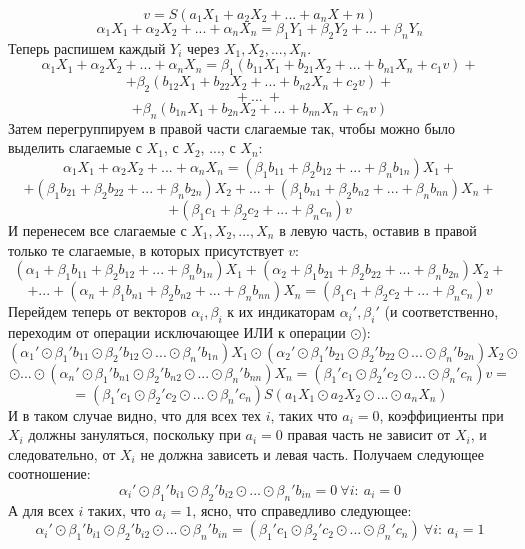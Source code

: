 \documentclass[a4paper,12pt]{report}
\theoremstyle{plain} %
\theoremstyle{definition}
\theoremstyle{remark}
\begin{document}
\begin{large}
$$v = S(a_1X_1 + a_2X_2 + ... + a_nX+n)$$
$$\alpha_1X_1 + \alpha_2X_2 + ... + \alpha_nX_n = \beta_1Y_1 + \beta_2Y_2 + ... + \beta_nY_n $$
Теперь распишем каждый $Y_i$ через $X_1, X_2, ..., X_n$.
$$\alpha_1X_1 + \alpha_2X_2 + ... + \alpha_nX_n = \beta_1(b_{11}X_1 + b_{21}X_2 + ... + b_{n1}X_n + c_1v) +$$
$$ +  \beta_2(b_{12}X_1 + b_{22}X_2 + ... + b_{n2}X_n + c_2v) +$$
$$+~ ...~ +$$
$$+ \beta_n(b_{1n}X_1 + b_{2n}X_2 + ... + b_{nn}X_n + c_nv) $$
Затем перегруппируем в правой части слагаемые так, чтобы можно было выделить слагаемые с $X_1$, с $X_2$, ..., с $X_n$:
$$\alpha_1X_1 + \alpha_2X_2 + ... + \alpha_nX_n = (\beta_1b_{11} + \beta_2b_{12} + ... + \beta_nb_{1n})X_1 + $$
$$+(\beta_1b_{21} + \beta_2b_{22} + ... + \beta_nb_{2n})X_2 + ... + (\beta_1b_{n1} + \beta_2b_{n2} + ... + \beta_nb_{nn})X_n+$$
$$+ (\beta_1c_1 + \beta_2c_2 + ... + \beta_nc_n)v$$
И перенесем все слагаемые с $X_1, X_2, ..., X_n$ в левую часть, оставив в правой только те слагаемые, в которых присутствует $v$:
$$ (\alpha_1 + \beta_1b_{11} + \beta_2b_{12} + ... + \beta_nb_{1n})X_1 + (\alpha_2 + \beta_1b_{21} + \beta_2b_{22} + ... + \beta_nb_{2n})X_2 + $$
$$+...+ (\alpha_n + \beta_1b_{n1} + \beta_2b_{n2} + ... + \beta_nb_{nn})X_n =  (\beta_1c_1 + \beta_2c_2 + ... + \beta_nc_n)v$$
Перейдем теперь от векторов $\alpha_i, \beta_i$ к их индикаторам $\alpha_i', \beta_i'$ (и соответственно, переходим от операции исключающее ИЛИ к операции $\odot$):
$$ (\alpha_1' \odot \beta_1'b_{11} \odot \beta_2'b_{12} \odot ... \odot \beta_n'b_{1n})X_1 \odot (\alpha_2' \odot \beta_1'b_{21} \odot \beta_2'b_{22} \odot ... \odot \beta_n'b_{2n})X_2 \odot $$
$$\odot...\odot (\alpha_n' \odot \beta_1'b_{n1} \odot \beta_2'b_{n2} \odot ... \odot \beta_n'b_{nn})X_n =  (\beta_1'c_1 \odot \beta_2'c_2 \odot ... \odot \beta_n'c_n)v = $$
\begin{equation}\label{eq:not_final_lin}=(\beta_1'c_1 \odot \beta_2'c_2 \odot ... \odot \beta_n'c_n)S(a_1X_1 \odot a_2X_2 \odot ... \odot a_nX_n)\end{equation}
И в таком случае видно, что для всех тех $i$, таких что $a_i = 0$, коэффициенты при $X_i$ должны зануляться, поскольку при $a_i = 0$ правая часть не зависит от $X_i$, и следовательно, от $X_i$ не должна зависеть и левая часть. Получаем следующее соотношение: 
$$\alpha_i' \odot \beta_1'b_{i1} \odot \beta_2'b_{i2} \odot ... \odot \beta_n'b_{in} = 0 ~ \forall i: ~a_i = 0$$
А для всех $i$ таких, что $a_i = 1$, ясно, что справедливо следующее:
$$\alpha_i' \odot \beta_1'b_{i1} \odot \beta_2'b_{i2} \odot ... \odot \beta_n'b_{in} = (\beta_1'c_1 \odot \beta_2'c_2 \odot ... \odot \beta_n'c_n) ~ \forall i: ~a_i = 1$$

\end{large}
\end{document}
